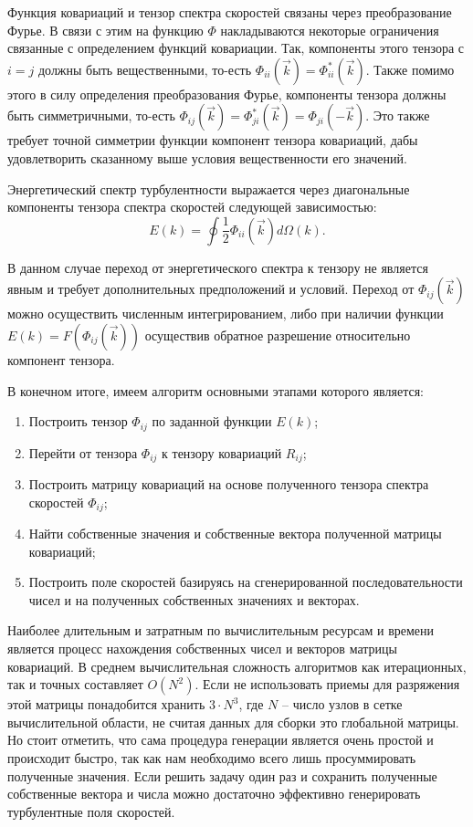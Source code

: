 Функция ковариаций и тензор спектра скоростей связаны через преобразование Фурье. В связи с этим на функцию $\Phi$ накладываются некоторые ограничения связанные с определением функций ковариации. Так, компоненты этого тензора с $i=j$ должны быть вещественными, то-есть $\Phi_{ii}(\vec k) = \Phi_{ii}^{*}(\vec k)$. Также помимо этого в силу определения преобразования Фурье, компоненты тензора должны быть симметричными, то-есть $\Phi_{ij}(\vec k)=\Phi_{ji}^{*}(\vec k)=\Phi_{ji}(-\vec k)$. Это также требует точной симметрии функции компонент тензора ковариаций, дабы удовлетворить сказанному выше условия вещественности его значений. 

Энергетический спектр турбулентности выражается через диагональные компоненты тензора спектра скоростей следующей зависимостью:
\begin{equation}
    \label{eq:kriging_equation15}
    E(k) = \oint \frac{1}{2} \Phi_{ii}(\vec k) d \Omega (k).
\end{equation}

В данном случае переход от энергетического спектра к тензору не является явным и требует дополнительных предположений и условий. Переход от $\Phi_{ij}(\vec k)$ можно осуществить численным интегрированием, либо при наличии функции $E(k)=F(\Phi_{ij}(\vec k))$ осуществив обратное разрешение относительно компонент тензора.

В конечном итоге, имеем алгоритм основными этапами которого является:
\begin{enumerate}
    \item Построить тензор $\Phi_{ij}$ по заданной функции $E(k)$;
    \item Перейти от тензора $\Phi_{ij}$ к тензору ковариаций $R_{ij}$;
    \item Построить матрицу ковариаций на основе полученного тензора спектра скоростей $\Phi_{ij}$;
    \item Найти собственные значения и собственные вектора полученной матрицы ковариаций;
    \item Построить поле скоростей базируясь на сгенерированной последовательности чисел и на полученных собственных значениях и векторах.
\end{enumerate}

Наиболее длительным и затратным по вычислительным ресурсам и времени является процесс нахождения собственных чисел и векторов матрицы ковариаций. В среднем вычислительная сложность алгоритмов как итерационных, так и точных составляет $O(N^2)$. Если не использовать приемы для разряжения этой матрицы понадобится хранить $3 \cdot N^3$, где $N$ -- число узлов в сетке вычислительной области, не считая данных для сборки это глобальной матрицы. Но стоит отметить, что сама процедура генерации является очень простой и происходит быстро, так как нам необходимо всего лишь просуммировать полученные значения. Если решить задачу один раз и сохранить полученные собственные вектора и числа можно достаточно эффективно генерировать турбулентные поля скоростей.

